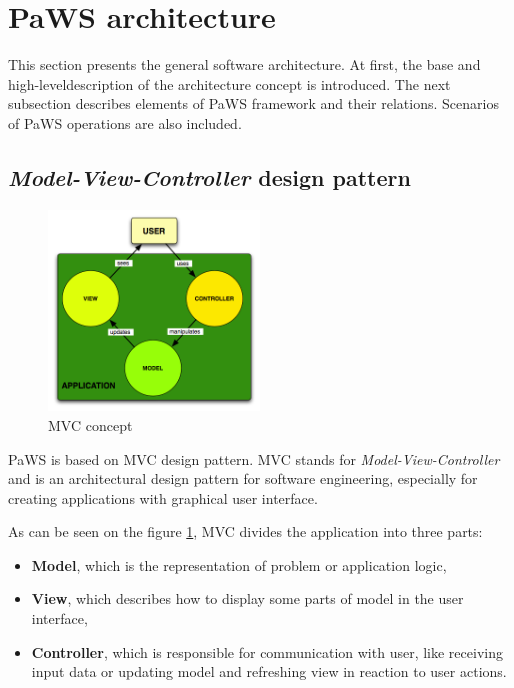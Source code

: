 \section{PaWS architecture}

This section presents the general software architecture. At first, the base and high-leveldescription of the architecture concept is introduced. The next subsection describes elements of PaWS framework and their relations. Scenarios of PaWS operations are also included.

\subsection{\emph{Model-View-Controller} design pattern}
\label{mvc}

\begin{figure}[h!]
  \centering
  \includegraphics[width=0.5\textwidth]{reportCh2/mvc}
  \caption{MVC concept\cite{mvc_for_php}}
  \label{fig:mvc}
\end{figure}

PaWS is based on MVC\cite{mvc} design pattern. MVC stands for \emph{Model-View-Controller} and is an architectural design pattern for software engineering, especially for creating applications with graphical user interface. 

As can be seen on the figure \ref{fig:mvc}, MVC divides the application into three parts: 
\begin{itemize}
  \item {\bf Model}, which is the representation of problem or application logic, 
  \item {\bf View}, which describes how to display some parts of model in the user interface,
  \item {\bf Controller}, which is responsible for communication with user, like receiving input data or updating model and refreshing view in reaction to user actions.
\end{itemize}


